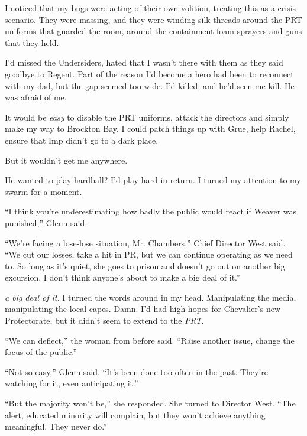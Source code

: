 I noticed that my bugs were acting of their own volition, treating this as a crisis scenario.  They were massing, and they were winding silk threads around the PRT uniforms that guarded the room, around the containment foam sprayers and guns that they held.



I'd missed the Undersiders, hated that I wasn't there with them as they said goodbye to Regent.  Part of the reason I'd become a hero had been to reconnect with my dad, but the gap seemed too wide.  I'd killed, and he'd seen me kill.  He was afraid of me.



It would be \emph{easy} to disable the PRT uniforms, attack the directors and simply make my way to Brockton Bay.  I could patch things up with Grue, help Rachel, ensure that Imp didn't go to a dark place.



But it wouldn't get me anywhere.



He wanted to play hardball?  I'd play hard in return.  I turned my attention to my swarm for a moment.



``I think you're underestimating how badly the public would react if Weaver was punished,'' Glenn said.



``We're facing a lose-lose situation, Mr. Chambers,'' Chief Director West said.  ``We cut our losses, take a hit in PR, but we can continue operating as we need to.  So long as it's quiet, she goes to prison and doesn't go out on another big excursion, I don't think anyone's about to make a big deal of it.''



\emph{\ldotsmake a big deal of it. } I turned the words around in my head.  Manipulating the media, manipulating the local capes.  Damn.  I'd had high hopes for Chevalier's new Protectorate, but it didn't seem to extend to the \emph{PRT}.



``We can deflect,'' the woman from before said.  ``Raise another issue, change the focus of the public.''



``Not so easy,'' Glenn said.  ``It's been done too often in the past.  They're watching for it, even anticipating it.''



``But the majority won't be,'' she responded.  She turned to Director West.  ``The alert, educated minority will complain, but they won't achieve anything meaningful.  They never do.''



